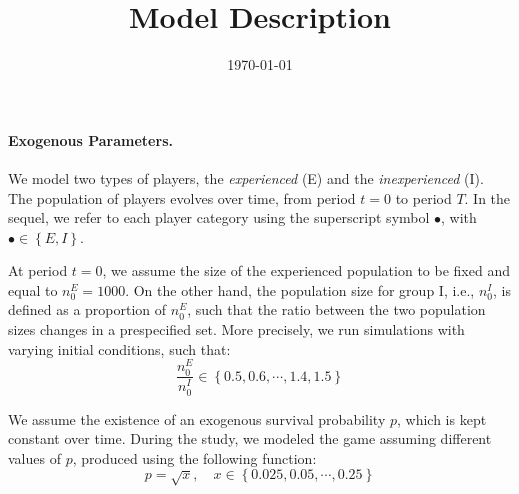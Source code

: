 \documentclass{article}
\title{Model Description}
\date{\today}
\begin{document}
\maketitle

\paragraph{Exogenous Parameters.}

We model two types of players, the \textit{experienced} (E) and the
\textit{inexperienced} (I). The population of players evolves over time, from
period $t=0$ to period $T$. In the sequel, we refer to each player category
using the superscript symbol $\bullet$, with $\bullet \in \left\{ E, I \right\}$.

At period $t=0$, we assume the size of the experienced population to be fixed
and equal to $n^E_{0} = 1000$. On the other hand, the population size for group I,
i.e., $n^I_0$, is defined as a proportion of $n^E_{0}$, such that the ratio between
the two population sizes changes in a prespecified set. More precisely, we run
simulations with varying initial conditions, such that:
\begin{equation}
\frac{n^E_0}{n^I_0} \in \left\{ 0.5, 0.6, \cdots, 1.4, 1.5 \right\}
\label{eq:ratioE_I}
\end{equation}


We assume the existence of an exogenous survival probability $p$, which is kept
constant over time. During the study, we modeled the game assuming different
values of $p$, produced using the following function:
\begin{equation}
p = \sqrt{x}, \quad x \in \left\{ 0.025, 0.05, \cdots, 0.25 \right\}
\label{eq:p-objective}
\end{equation}
\end{document}
